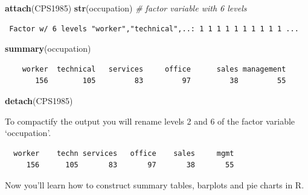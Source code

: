 \documentclass[
]{book}
\newenvironment{Shaded}{\begin{snugshade}}{\end{snugshade}}
\newcommand{\CommentTok}[1]{\textcolor[rgb]{0.56,0.35,0.01}{\textit{#1}}}
\newcommand{\DecValTok}[1]{\textcolor[rgb]{0.00,0.00,0.81}{#1}}
\newcommand{\KeywordTok}[1]{\textcolor[rgb]{0.13,0.29,0.53}{\textbf{#1}}}
\newcommand{\NormalTok}[1]{#1}
\newcommand{\OperatorTok}[1]{\textcolor[rgb]{0.81,0.36,0.00}{\textbf{#1}}}
\newcommand{\StringTok}[1]{\textcolor[rgb]{0.31,0.60,0.02}{#1}}
\begin{document}
\begin{Shaded}
\begin{Highlighting}[]
\KeywordTok{attach}\NormalTok{(CPS1985)}
\KeywordTok{str}\NormalTok{(occupation) }\CommentTok{# factor variable with 6 levels}
\end{Highlighting}
\end{Shaded}

\begin{verbatim}
 Factor w/ 6 levels "worker","technical",..: 1 1 1 1 1 1 1 1 1 1 ...
\end{verbatim}

\begin{Shaded}
\begin{Highlighting}[]
\KeywordTok{summary}\NormalTok{(occupation)}
\end{Highlighting}
\end{Shaded}

\begin{verbatim}
    worker  technical   services     office      sales management 
       156        105         83         97         38         55 
\end{verbatim}

\begin{Shaded}
\begin{Highlighting}[]
\KeywordTok{detach}\NormalTok{(CPS1985)}
\end{Highlighting}
\end{Shaded}

To compactify the output you will rename levels 2 and 6 of the factor variable `occupation'.

\begin{Shaded}
\end{Shaded}

\begin{verbatim}
  worker    techn services   office    sales     mgmt 
     156      105       83       97       38       55 
\end{verbatim}

Now you'll learn how to construct summary tables, barplots and pie charts in R.
\end{document}
